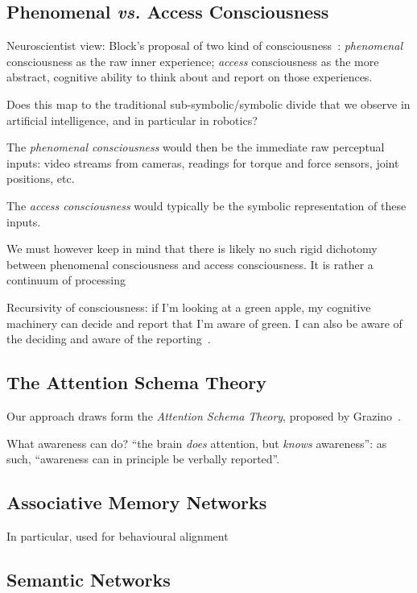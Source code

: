 \documentclass[a4paper]{article}
\newcommand{\vs}{\textit{vs.}\xspace}
\begin{document}
\subsection{Phenomenal \vs Access Consciousness}

Neuroscientist view: Block's proposal of two kind of consciousness~\cite{block1996can}:
\emph{phenomenal} consciousness as the raw inner experience; \emph{access}
consciousness as the more abstract, cognitive ability to think about and report
on those experiences.

Does this map to the traditional sub-symbolic/symbolic divide that we observe in
artificial intelligence, and in particular in robotics?

The \emph{phenomenal consciousness} would then be the immediate raw perceptual
inputs: video streams from cameras, readings for torque and force sensors, joint
positions, etc.

The \emph{access consciousness} would typically be the symbolic representation
of these inputs.


We must however keep in mind that there is likely no such rigid dichotomy
between phenomenal consciousness and access consciousness. It is rather a
continuum of processing~\citep[p.55]{graziano2013consciousness}

Recursivity of consciousness: if I'm looking at a green apple, my cognitive
machinery can decide and report that I'm aware of green. I can also be aware of
the deciding and aware of the reporting~\citep[p.55]{graziano2013consciousness}.

\subsection{The Attention Schema Theory}

Our approach draws form the \emph{Attention Schema Theory}, proposed by
Grazino~\cite{graziano2013consciousness}.

What awareness can do? ``the brain \emph{does} attention, but \emph{knows}
awareness'': as such, ``awareness can in principle be verbally reported''.



\subsection{Associative Memory Networks}


In particular, used for behavioural alignment

\subsection{Semantic Networks}
\end{document}
